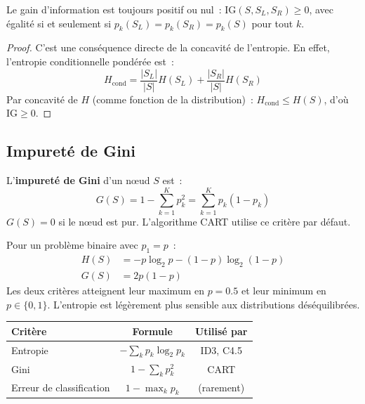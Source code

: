 \begin{proposition}
Le gain d'information est toujours positif ou nul~:
$\text{IG}(S, S_L, S_R) \geq 0$, avec \'egalit\'e si et seulement si
$p_k(S_L) = p_k(S_R) = p_k(S)$ pour tout $k$.
\end{proposition}

\begin{proof}
C'est une cons\'equence directe de la concavit\'e de l'entropie. En effet,
l'entropie conditionnelle pond\'er\'ee est~:
\[
  H_{\text{cond}} = \frac{|S_L|}{|S|} H(S_L) + \frac{|S_R|}{|S|} H(S_R)
\]
Par concavit\'e de $H$ (comme fonction de la distribution)~:
$H_{\text{cond}} \leq H(S)$, d'o\`u $\text{IG} \geq 0$.
\end{proof}

\subsection{Impuret\'e de Gini}

\begin{definition}
L'\textbf{impuret\'e de Gini} d'un n\oe{}ud $S$ est~:
\begin{equation}
  G(S) = 1 - \sum_{k=1}^K p_k^2 = \sum_{k=1}^K p_k(1 - p_k)
  \label{eq:gini}
\end{equation}
$G(S) = 0$ si le n\oe{}ud est pur. L'algorithme CART utilise ce crit\`ere
par d\'efaut.
\end{definition}

\begin{exemple}
Pour un probl\`eme binaire avec $p_1 = p$~:
\begin{align}
  H(S) &= -p\log_2 p - (1-p)\log_2(1-p) \\
  G(S) &= 2p(1-p)
\end{align}
Les deux crit\`eres atteignent leur maximum en $p = 0.5$ et leur minimum en
$p \in \{0, 1\}$. L'entropie est l\'eg\`erement plus sensible aux
distributions d\'es\'equilibr\'ees.
\end{exemple}

\begin{formules}[title=\textbf{R\'ecapitulatif des crit\`eres}]
\begin{center}
\begin{tabular}{lcc}
\toprule
\textbf{Crit\`ere} & \textbf{Formule} & \textbf{Utilis\'e par} \\
\midrule
Entropie & $-\sum_k p_k \log_2 p_k$ & ID3, C4.5 \\
Gini & $1 - \sum_k p_k^2$ & CART \\
Erreur de classification & $1 - \max_k p_k$ & (rarement) \\
\bottomrule
\end{tabular}
\end{center}
\end{formules}

